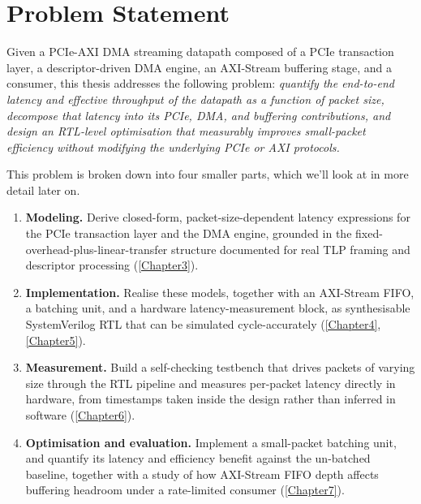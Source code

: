 \section{Problem Statement}
\label{sec:ch1_problem}


Given a PCIe-AXI DMA streaming datapath composed of a PCIe transaction layer, a descriptor-driven DMA engine, an AXI-Stream buffering stage, and a consumer, this thesis addresses the following problem: \emph{quantify the end-to-end latency and effective throughput of the datapath as a function of packet size, decompose that latency into its PCIe, DMA, and buffering contributions, and design an RTL-level optimisation that measurably improves small-packet efficiency without modifying the underlying PCIe or AXI protocols.}

This problem is broken down into four smaller parts, which we'll look at in more detail later on.
\begin{enumerate}
\item \textbf{Modeling.} Derive closed-form, packet-size-dependent latency expressions for the PCIe transaction layer and the DMA engine, grounded in the fixed-overhead-plus-linear-transfer structure documented for real TLP framing and descriptor processing (\autoref{Chapter3}).
\item \textbf{Implementation.} Realise these models, together with an AXI-Stream FIFO, a batching unit, and a hardware latency-measurement block, as synthesisable SystemVerilog RTL that can be simulated cycle-accurately (\autoref{Chapter4}, \autoref{Chapter5}).
\item \textbf{Measurement.} Build a self-checking testbench that drives packets of varying size through the RTL pipeline and measures per-packet latency directly in hardware, from timestamps taken inside the design rather than inferred in software (\autoref{Chapter6}).
\item \textbf{Optimisation and evaluation.} Implement a small-packet batching unit, and quantify its latency and efficiency benefit against the un-batched baseline, together with a study of how AXI-Stream FIFO depth affects buffering headroom under a rate-limited consumer (\autoref{Chapter7}).
\end{enumerate}